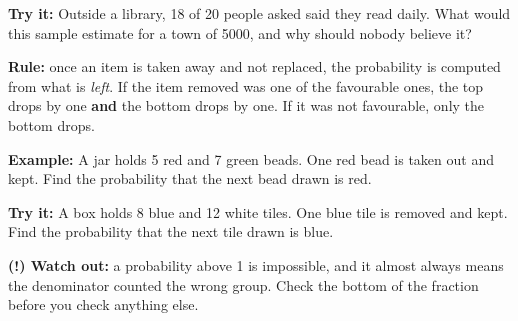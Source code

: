 \documentclass[12pt]{article}
\begin{document}
\begin{tryitbox}
\textbf{Try it:} \quad Outside a library, 18 of 20 people asked said they read
daily. What would this sample estimate for a town of 5000, and why should nobody
believe it?\\[2pt]
\end{tryitbox}


\begin{formulabox}
\textbf{Rule:} once an item is taken away and not replaced, the probability is
computed from what is \emph{left}. If the item removed was one of the favourable
ones, the top drops by one \textbf{and} the bottom drops by one. If it was not
favourable, only the bottom drops.
\end{formulabox}

\begin{examplebox}
\textbf{Example:} \quad A jar holds 5 red and 7 green beads. One red bead is
taken out and kept. Find the probability that the next bead drawn is red.
\end{examplebox}

\begin{tryitbox}
\textbf{Try it:} \quad A box holds 8 blue and 12 white tiles. One blue tile is
removed and kept. Find the probability that the next tile drawn is blue.\\[2pt]
\end{tryitbox}

\begin{watchoutbox}
\textbf{(!) Watch out:} a probability above 1 is impossible, and it almost
always means the denominator counted the wrong group. Check the bottom of the
fraction before you check anything else.
\end{watchoutbox}
\end{document}
